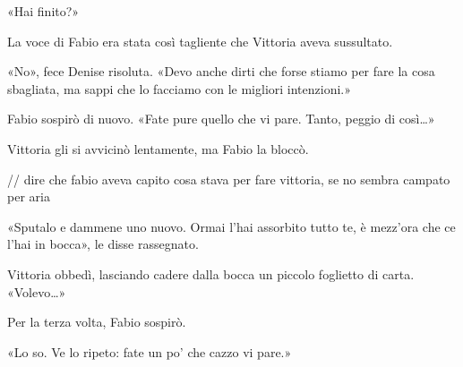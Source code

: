 «Hai finito?»

La voce di Fabio era stata così tagliente che Vittoria aveva sussultato.

«No», fece Denise risoluta. «Devo anche dirti che forse stiamo per fare la cosa sbagliata, ma sappi che lo facciamo con le migliori intenzioni.»

Fabio sospirò di nuovo. «Fate pure quello che vi pare. Tanto, peggio di così\ldots»

Vittoria gli si avvicinò lentamente, ma Fabio la bloccò.

// dire che fabio aveva capito cosa stava per fare vittoria, se no sembra campato per aria

«Sputalo e dammene uno nuovo. Ormai l'hai assorbito tutto te, è mezz'ora che ce l'hai in bocca», le disse rassegnato.

Vittoria obbedì, lasciando cadere dalla bocca un piccolo foglietto di carta. «Volevo\ldots»

Per la terza volta, Fabio sospirò.

«Lo so. Ve lo ripeto: fate un po' che cazzo vi pare.»
